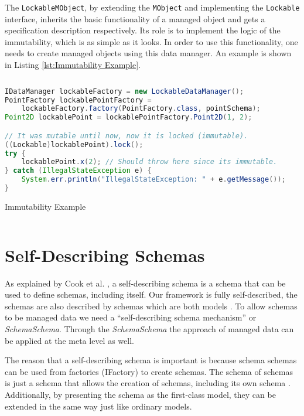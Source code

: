 The \texttt{LockableMObject}, by extending the \texttt{MObject} and implementing the \texttt{Lockable} interface, inherits the basic functionality of a managed object and gets a specification description respectively.
Its role is to implement the logic of the immutability, which is as simple as it looks.
In order to use this functionality, one needs to create managed objects using this data manager.
An example is shown in Listing \ref{lst:Immutability Example}.

\begin{sourcecode} [H]
	\begin{lstlisting}[language=Java, escapechar=|]
IDataManager lockableFactory = new LockableDataManager();
PointFactory lockablePointFactory = 
	lockableFactory.factory(PointFactory.class, pointSchema);
Point2D lockablePoint = lockablePointFactory.Point2D(1, 2);

// It was mutable until now, now it is locked (immutable).
((Lockable)lockablePoint).lock();
try {
	lockablePoint.x(2); // Should throw here since its immutable.
} catch (IllegalStateException e) {
	System.err.println("IllegalStateException: " + e.getMessage());
}
	\end{lstlisting}
	\caption{Immutability Example}
	\label{lst:Immutability Example}
\end{sourcecode}

\section{Self-Describing Schemas}\label{Self-Describing Schemas}
As explained by Cook et al. \cite{loh2012managed}, a self-describing schema is a schema that can be used to define schemas, including itself.
Our framework is fully self-described, the schemas are also described by schemas which are both models \cite{kurtev2006model}. 
To allow schemas to be managed data we need a ``self-describing schema mechanism'' or \textit{SchemaSchema}.
Through the \textit{SchemaSchema} the approach of managed data can be applied at the meta level as well.

The reason that a self-describing schema is important is because schema schemas can be used from factories (IFactory) to create schemas.
The schema of schemas is just a schema that allows the creation of schemas, including its own schema \cite{storm2012object}.
Additionally, by presenting the schema as the first-class model\cite{kurtev2006model}, they can be extended in the same way just like ordinary models.

